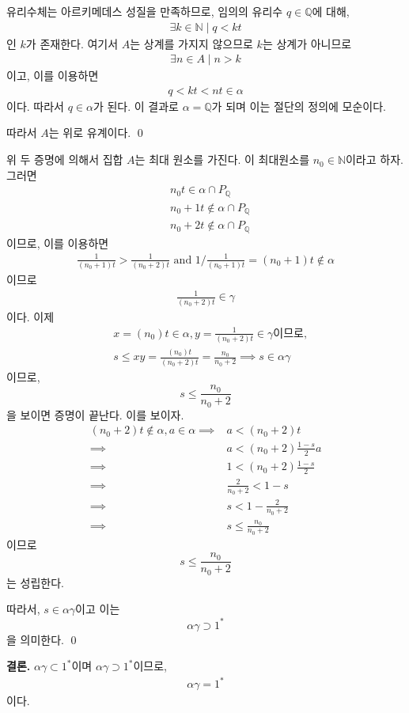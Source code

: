 \documentclass{article}
\begin{document}
유리수체는 아르키메데스 성질을 만족하므로, 임의의 유리수 $q \in \mathbb{Q}$에 대해,
\begin{align*}
\exists k \in \mathbb{N} \mid  q < kt
\end{align*}인 $k$가 존재한다. 여기서 $A$는 상계를 가지지 않으므로 $k$는 상계가 아니므로
\begin{align*}
\exists n \in A \mid n > k 
\end{align*}이고, 이를 이용하면
\begin{align*}
q < kt < nt \in \alpha
\end{align*}이다. 따라서 $q \in \alpha$가 된다. 이 결과로 $\alpha = \mathbb{Q}$가 되며 이는 절단의 정의에 모순이다. 

따라서 $A$는 위로 유계이다. \qed

위 두 증명에 의해서 집합 $A$는 최대 원소를 가진다. 이 최대원소를 $n_0 \in \mathbb{N}$이라고 하자. 그러면
\begin{align*}
&{n_0}t \in \alpha \cap P_{\mathbb{Q}}
\\ &{n_0 + 1}t \notin \alpha \cap P_{\mathbb{Q}}
\\ &{n_0 + 2}t \notin \alpha \cap P_{\mathbb{Q}}
\end{align*}이므로, 이를 이용하면
\begin{align*}
\frac{1}{(n_0 + 1)t} > \frac{1}{(n_0 + 2)t} \text{ and } 1 / \frac{1}{(n_0 + 1)t} = (n_0 + 1)t \notin \alpha
\end{align*}이므로 
\begin{align*}
\frac{1}{(n_0 + 2)t} \in \gamma
\end{align*}이다. 이제
\begin{align*}
&x = (n_0)t \in \alpha, y = \frac{1}{(n_0 + 2)t}  \in \gamma \text{이므로,}
\\&s \le  xy = \frac{(n_0)t}{(n_0+2)t} = \frac{n_0}{n_0+2} \implies s \in \alpha \gamma
\end{align*} 이므로, $$s \le \frac{n_0}{n_0+2}$$을 보이면 증명이 끝난다. 이를 보이자.
\begin{align*}
(n_0+2)t \notin \alpha, a \in \alpha \implies& a < (n_0+2)t
\\ \implies& a < (n_0+2) \frac{1-s}{2} a
\\ \implies& 1 < (n_0+2) \frac{1-s}{2} \tag{$a > 0$}
\\ \implies& \frac{2}{n_0+2} < 1-s 
\\ \implies& s < 1 -  \frac{2}{n_0+2}
\\ \implies& s \le \frac{n_0}{n_0+2}
\end{align*}이므로 $$s \le \frac{n_0}{n_0+2}$$는 성립한다.

따라서, $s \in \alpha \gamma$이고 이는
$$\alpha \gamma \supset 1^*$$을 의미한다. \qed





\textbf{결론.} $\alpha \gamma \subset 1^*$이며 $\alpha \gamma \supset 1^*$이므로,
\begin{align*}
\alpha \gamma = 1^*
\end{align*}이다.
\end{document}
